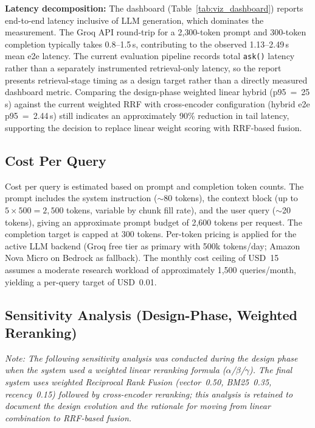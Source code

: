 \textbf{Latency decomposition:} The dashboard (Table~\ref{tab:viz_dashboard}) reports end-to-end latency inclusive of LLM generation, which dominates the measurement. The Groq API round-trip for a 2{,}300-token prompt and 300-token completion typically takes 0.8--1.5\,s, contributing to the observed 1.13--2.49\,s mean e2e latency. The current evaluation pipeline records total \texttt{ask()} latency rather than a separately instrumented retrieval-only latency, so the report presents retrieval-stage timing as a design target rather than a directly measured dashboard metric. Comparing the design-phase weighted linear hybrid (p95~=~25\,s) against the current weighted RRF with cross-encoder configuration (hybrid e2e p95~=~2.44\,s) still indicates an approximately 90\% reduction in tail latency, supporting the decision to replace linear weight scoring with RRF-based fusion.

\subsection{Cost Per Query}

Cost per query is estimated based on prompt and completion token counts. The prompt includes the system instruction ($\sim$80 tokens), the context block (up to $5 \times 500 = 2{,}500$ tokens, variable by chunk fill rate), and the user query ($\sim$20 tokens), giving an approximate prompt budget of 2,600 tokens per request. The completion target is capped at 300 tokens. Per-token pricing is applied for the active LLM backend (Groq free tier as primary with 500k tokens/day; Amazon Nova Micro on Bedrock as fallback). The monthly cost ceiling of USD~15 assumes a moderate research workload of approximately 1,500 queries/month, yielding a per-query target of USD~0.01.

\subsection{Sensitivity Analysis (Design-Phase, Weighted Reranking)}
\label{sec:sensitivity}

\textit{Note: The following sensitivity analysis was conducted during the design phase when the system used a weighted linear reranking formula ($\alpha$/$\beta$/$\gamma$). The final system uses weighted Reciprocal Rank Fusion (vector~0.50, BM25~0.35, recency~0.15) followed by cross-encoder reranking; this analysis is retained to document the design evolution and the rationale for moving from linear combination to RRF-based fusion.}

